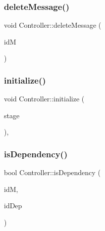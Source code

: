 \subsubsection{\texorpdfstring{delete\+Message()}{deleteMessage()}}
{\footnotesize\ttfamily void Controller\+::delete\+Message (\begin{DoxyParamCaption}\item[{\hyperlink{structures_8h_a83a1d9a070efa5341da84cfd8e28d3e5}{id\+Msg}}]{idM }\end{DoxyParamCaption})\hspace{0.3cm}{\ttfamily [private]}}

\mbox{\label{class_controller_aa813a54b625a16ee0c039838b8cdd661}} 
\subsubsection{\texorpdfstring{initialize()}{initialize()}}
{\footnotesize\ttfamily void Controller\+::initialize (\begin{DoxyParamCaption}\item[{int}]{stage }\end{DoxyParamCaption})\hspace{0.3cm}{\ttfamily [private]}, {\ttfamily [virtual]}}

\mbox{\label{class_controller_ad76a99df69bf99705dc18ba72b4b04c2}} 
\subsubsection{\texorpdfstring{is\+Dependency()}{isDependency()}}
{\footnotesize\ttfamily bool Controller\+::is\+Dependency (\begin{DoxyParamCaption}\item[{\hyperlink{structures_8h_a83a1d9a070efa5341da84cfd8e28d3e5}{id\+Msg}}]{idM,  }\item[{\hyperlink{structures_8h_a83a1d9a070efa5341da84cfd8e28d3e5}{id\+Msg}}]{id\+Dep }\end{DoxyParamCaption})}

\mbox{\label{class_controller_a8905abf1976e737410ac0142001e38a0}} 

